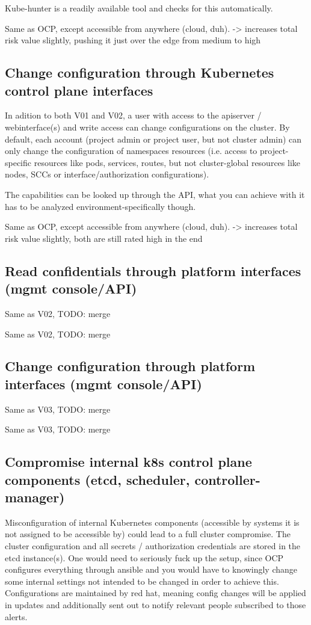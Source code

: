 Kube-hunter is a readily available tool and checks for this automatically.

Same as OCP, except accessible from anywhere (cloud, duh).
-> increases total risk value slightly, pushing it just over the edge from medium to high

\subsection{Change configuration through Kubernetes control plane interfaces}
In adition to both V01 and V02, a user with access to the apiserver / webinterface(s) and write access can change configurations on the cluster. By default, each account (project admin or project user, but not cluster admin) can only change the configuration of namespaces resources (i.e. access to project-specific resources like pods, services, routes, but not cluster-global resources like nodes, SCCs or interface/authorization configurations). 

The capabilities can be looked up through the API, what you can achieve with it has to be analyzed environment-specifically though.

Same as OCP, except accessible from anywhere (cloud, duh).
-> increases total risk value slightly, both are still rated high in the end

\subsection{Read confidentials through platform interfaces (mgmt console/API)}
Same as V02, TODO: merge

Same as V02, TODO: merge

\subsection{Change configuration through platform interfaces (mgmt console/API)}
Same as V03, TODO: merge

Same as V03, TODO: merge

\subsection{Compromise internal k8s control plane components (etcd, scheduler, controller-manager)}
Misconfiguration of internal Kubernetes components (accessible by systems it is not assigned to be accessible by) could lead to a full cluster compromise. The cluster configuration and all secrets / authorization credentials are stored in the etcd instance(s). One would need to seriously fuck up the setup, since OCP configures everything through ansible and you would have to knowingly change some internal settings not intended to be changed in order to achieve this. Configurations are maintained by red hat, meaning config changes will be applied in updates and additionally sent out to notify relevant people subscribed to those alerts.

